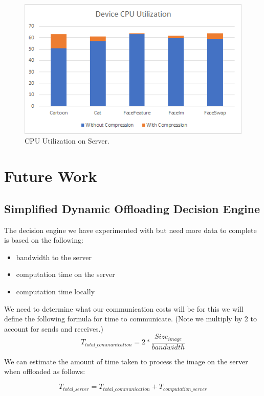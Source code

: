 \documentclass{sig-alternate}
\begin{document}
\begin{figure}[H]
\noindent \includegraphics[scale=.5]{Graph2.png}
\caption{CPU Utilization on Server.}
\end{figure}

\section{Future Work}
\subsection{Simplified Dynamic Offloading Decision Engine}
The decision engine we have experimented with but need more data to complete is based on the following:

\begin{itemize}
\item bandwidth to the server
\item computation time on the server
\item computation time locally
\end{itemize}

We need to determine what our communication costs will be for this we will define
the following formula for time to communicate. (Note we multiply by 2 to account for sends and receives.)
\begin{equation}
T_{total\_communication} = 2 * \frac{Size_{image}}{bandwidth}
\end{equation}

We can estimate the amount of time taken to process the image on the server when
offloaded as follows:

\begin{equation}
T_{total\_server} = T_{total\_communication} + T_{computation\_server}
\end{equation}
\end{document}
